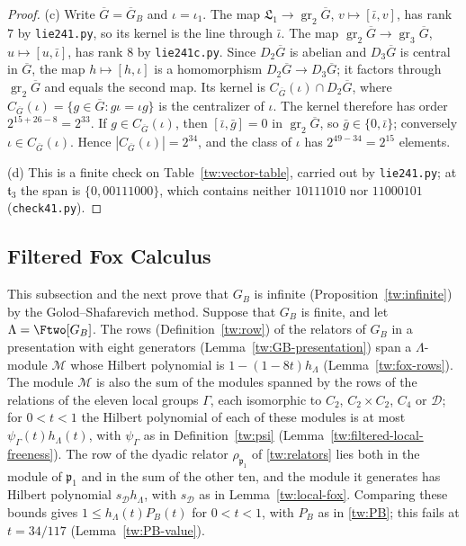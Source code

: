 \begin{proof}
(c) Write $\overline G=\overline G_B$ and $\iota=\iota_1$. The map
$\mathfrak L_1\to\operatorname{gr}_2\overline G$, $v\mapsto[\bar\iota,v]$, has
rank $7$ by \texttt{lie241.py}, so its kernel is the line through
$\bar\iota$. The map
$\operatorname{gr}_2\overline G\to\operatorname{gr}_3\overline G$,
$u\mapsto[u,\bar\iota]$, has rank $8$ by \texttt{lie241c.py}. Since
$D_2\overline G$ is abelian and $D_3\overline G$ is central in $\overline G$,
the map $h\mapsto[h,\iota]$ is a homomorphism $D_2\overline G\to D_3\overline G$;
it factors through $\operatorname{gr}_2\overline G$ and equals the second map.
Its kernel is $C_{\overline G}(\iota)\cap D_2\overline G$, where
$C_{\overline G}(\iota)=\{g\in\overline G:g\iota=\iota g\}$ is the
centralizer of $\iota$. The kernel therefore has order
$2^{15+26-8}=2^{33}$. If $g\in C_{\overline G}(\iota)$, then
$[\bar\iota,\bar g]=0$ in $\operatorname{gr}_2\overline G$, so
$\bar g\in\{0,\bar\iota\}$; conversely $\iota\in C_{\overline G}(\iota)$.
Hence $|C_{\overline G}(\iota)|=2^{34}$, and the class of $\iota$ has
$2^{49-34}=2^{15}$ elements.

(d) This is a finite check on Table~\ref{tw:vector-table}, carried out by
\texttt{lie241.py}; at $\mathfrak t_3$ the span is $\{0,00111000\}$, which
contains neither $10111010$ nor $11000101$ (\texttt{check41.py}).
\end{proof}

\subsection{Filtered Fox Calculus}\label{tw:fox-section}
This subsection and the next prove that $G_B$ is infinite
(Proposition~\ref{tw:infinite}) by the Golod--Shafarevich method. Suppose
that $G_B$ is finite, and let $\Lambda=\Ftwo[G_B]$. The rows
(Definition~\ref{tw:row}) of the relators of $G_B$ in a presentation with
eight generators (Lemma~\ref{tw:GB-presentation}) span a $\Lambda$-module
$\mathcal M$ whose Hilbert polynomial is $1-(1-8t)h_\Lambda$
(Lemma~\ref{tw:fox-rows}). The module $\mathcal M$ is also the sum of the
modules spanned by the rows of the relations of the eleven local groups
$\Gamma$, each isomorphic to $C_2$, $C_2\times C_2$, $C_4$ or $\mathcal D$; for $0<t<1$
the Hilbert polynomial of each of these modules is at most
$\psi_\Gamma(t)h_\Lambda(t)$, with $\psi_\Gamma$ as in
Definition~\ref{tw:psi} (Lemma~\ref{tw:filtered-local-freeness}). The row of
the dyadic relator $\rho_{\mathfrak p_1}$ of \eqref{tw:relators} lies both in
the module of $\mathfrak p_1$ and in the sum of the other ten, and the module
it generates has Hilbert polynomial $s_{\mathcal D}h_\Lambda$, with $s_{\mathcal D}$ as in
Lemma~\ref{tw:local-fox}. Comparing these bounds gives
$1\le h_\Lambda(t)P_B(t)$ for $0<t<1$, with $P_B$ as in \eqref{tw:PB}; this
fails at $t=34/117$ (Lemma~\ref{tw:PB-value}).

